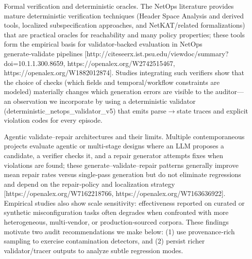\documentclass[conference]{IEEEtran}
\begin{document}
Formal verification and deterministic oracles. The NetOps literature provides mature deterministic verification techniques (Header Space Analysis and derived tools, localized subspecification approaches, and NetKAT/related formalizations) that are practical oracles for reachability and many policy properties; these tools form the empirical basis for validator‑backed evaluation in NetOps generate‑validate pipelines [http://citeseerx.ist.psu.edu/viewdoc/summary?doi=10.1.1.300.8659, https://openalex.org/W2742515467, https://openalex.org/W1882012874]. Studies integrating such verifiers show that the choice of checks (which fields and temporal/workflow constraints are modeled) materially changes which generation errors are visible to the auditor---an observation we incorporate by using a deterministic validator (deterministic\_netops\_validator\_v5) that emits parse\ensuremath{\rightarrow}state traces and explicit violation codes for every episode.

Agentic validate--repair architectures and their limits. Multiple contemporaneous projects evaluate agentic or multi‑stage designs where an LLM proposes a candidate, a verifier checks it, and a repair generator attempts fixes when violations are found; these generate--validate--repair patterns generally improve mean repair rates versus single‑pass generation but do not eliminate regressions and depend on the repair‑policy and localization strategy [https://openalex.org/W7162218766, https://openalex.org/W7163636922]. Empirical studies also show scale sensitivity: effectiveness reported on curated or synthetic misconfiguration tasks often degrades when confronted with more heterogeneous, multi‑vendor, or production‑sourced corpora. These findings motivate two audit recommendations we make below: (1) use provenance‑rich sampling to exercise contamination detectors, and (2) persist richer validator/tracer outputs to analyze subtle regression modes.
\end{document}
